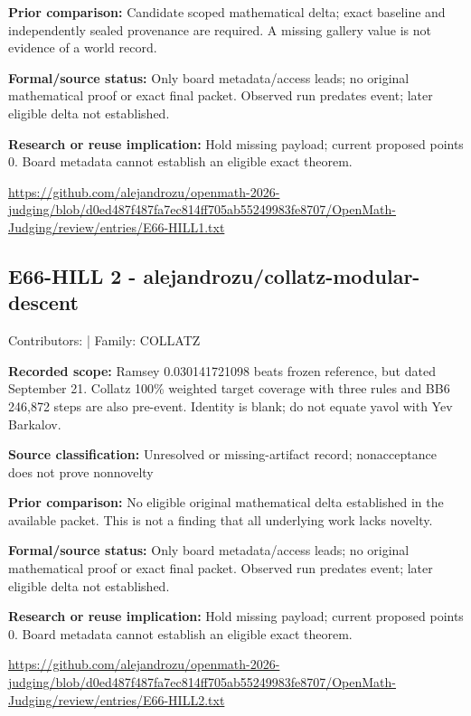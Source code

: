 \documentclass[11pt,a4paper]{article}
\begin{document}
\textbf{Prior comparison:} Candidate scoped mathematical delta; exact baseline and independently sealed provenance are required. A missing gallery value is not evidence of a world record.

\textbf{Formal/source status:} Only board metadata/access leads; no original mathematical proof or exact final packet. Observed run predates event; later eligible delta not established.

\textbf{Research or reuse implication:} Hold missing payload; current proposed points 0. Board metadata cannot establish an eligible exact theorem.

{\small \url{https://github.com/alejandrozu/openmath-2026-judging/blob/d0ed487f487fa7ec814ff705ab55249983fe8707/OpenMath-Judging/review/entries/E66-HILL1.txt}\par}

\begin{samepage}
\subsection{E66-HILL 2  -  alejandrozu/collatz-modular-descent}
{\small Contributors:  | Family: COLLATZ\par}

\textbf{Recorded scope:} Ramsey 0.030141721098 beats frozen reference, but dated September 21. Collatz 100\% weighted target coverage with three rules and BB6 246,872 steps are also pre-event. Identity is blank; do not equate yavol with Yev Barkalov.

\end{samepage}
\textbf{Source classification:} Unresolved or missing-artifact record; nonacceptance does not prove nonnovelty

\textbf{Prior comparison:} No eligible original mathematical delta established in the available packet. This is not a finding that all underlying work lacks novelty.

\textbf{Formal/source status:} Only board metadata/access leads; no original mathematical proof or exact final packet. Observed run predates event; later eligible delta not established.

\textbf{Research or reuse implication:} Hold missing payload; current proposed points 0. Board metadata cannot establish an eligible exact theorem.

{\small \url{https://github.com/alejandrozu/openmath-2026-judging/blob/d0ed487f487fa7ec814ff705ab55249983fe8707/OpenMath-Judging/review/entries/E66-HILL2.txt}\par}
\end{document}
